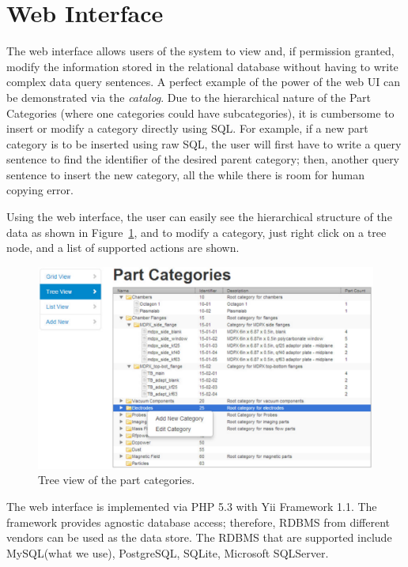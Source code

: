 
\section{Web Interface}

The web interface allows users of the system to view and, if permission granted, modify the information stored in the relational database without having to write complex data query sentences. A perfect example of the power of the web UI can be demonstrated via the \emph{catalog}. Due to the hierarchical nature of the Part Categories (where one categories could have subcategories), it is cumbersome to insert or modify a category directly using SQL. For example, if a new part category is to be inserted using raw SQL, the user will first have to write a query sentence to find the identifier of the desired parent category; then, another query sentence to insert the new category, all the while there is room for human copying error.

Using the web interface, the user can easily see the hierarchical structure of the data as shown in Figure~\ref{fig:partcat}, and to modify a category, just right click on a tree node, and a list of supported actions are shown.

\begin{figure}[h]
\centering
\includegraphics[width=6in]{partcat.pdf}
\caption{Tree view of the part categories.\label{fig:partcat}}
\end{figure}

The web interface is implemented via PHP 5.3 with Yii Framework 1.1. The framework provides agnostic database access; therefore, RDBMS from different vendors can be used as the data store. The RDBMS that are supported include MySQL(what we use), PostgreSQL, SQLite, Microsoft SQLServer.

